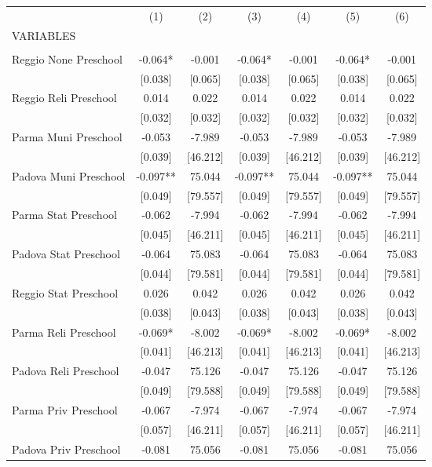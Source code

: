 \begin{tabular}{lcccccc} \hline
 & (1) & (2) & (3) & (4) & (5) & (6) \\
VARIABLES &  &  &  &  &  &  \\ \hline
 &  &  &  &  &  &  \\
Reggio None Preschool & -0.064* & -0.001 & -0.064* & -0.001 & -0.064* & -0.001 \\
 & [0.038] & [0.065] & [0.038] & [0.065] & [0.038] & [0.065] \\
Reggio Reli Preschool & 0.014 & 0.022 & 0.014 & 0.022 & 0.014 & 0.022 \\
 & [0.032] & [0.032] & [0.032] & [0.032] & [0.032] & [0.032] \\
Parma Muni Preschool & -0.053 & -7.989 & -0.053 & -7.989 & -0.053 & -7.989 \\
 & [0.039] & [46.212] & [0.039] & [46.212] & [0.039] & [46.212] \\
Padova Muni Preschool & -0.097** & 75.044 & -0.097** & 75.044 & -0.097** & 75.044 \\
 & [0.049] & [79.557] & [0.049] & [79.557] & [0.049] & [79.557] \\
Parma Stat Preschool & -0.062 & -7.994 & -0.062 & -7.994 & -0.062 & -7.994 \\
 & [0.045] & [46.211] & [0.045] & [46.211] & [0.045] & [46.211] \\
Padova Stat Preschool & -0.064 & 75.083 & -0.064 & 75.083 & -0.064 & 75.083 \\
 & [0.044] & [79.581] & [0.044] & [79.581] & [0.044] & [79.581] \\
Reggio Stat Preschool & 0.026 & 0.042 & 0.026 & 0.042 & 0.026 & 0.042 \\
 & [0.038] & [0.043] & [0.038] & [0.043] & [0.038] & [0.043] \\
Parma Reli Preschool & -0.069* & -8.002 & -0.069* & -8.002 & -0.069* & -8.002 \\
 & [0.041] & [46.213] & [0.041] & [46.213] & [0.041] & [46.213] \\
Padova Reli Preschool & -0.047 & 75.126 & -0.047 & 75.126 & -0.047 & 75.126 \\
 & [0.049] & [79.588] & [0.049] & [79.588] & [0.049] & [79.588] \\
Parma Priv Preschool & -0.067 & -7.974 & -0.067 & -7.974 & -0.067 & -7.974 \\
 & [0.057] & [46.211] & [0.057] & [46.211] & [0.057] & [46.211] \\
Padova Priv Preschool & -0.081 & 75.056 & -0.081 & 75.056 & -0.081 & 75.056 \\

\end{tabular}
